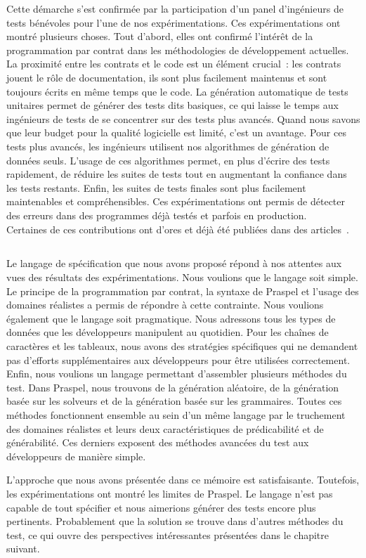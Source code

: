 Cette démarche s'est confirmée par la participation d'un panel d'ingénieurs de
tests bénévoles pour l'une de nos expérimentations. Ces expérimentations ont
montré plusieurs choses. Tout d'abord, elles ont confirmé l'intérêt de la
programmation par contrat dans les méthodologies de développement actuelles. La
proximité entre les contrats et le code est un élément crucial~: les contrats
jouent le rôle de documentation, ils sont plus facilement maintenus et sont
toujours écrits en même temps que le code. La génération automatique de tests
unitaires permet de générer des tests dits basiques, ce qui laisse le temps aux
ingénieurs de tests de se concentrer sur des tests plus avancés. Quand nous
savons que leur budget pour la qualité logicielle est limité, c'est un avantage.
Pour ces tests plus avancés, les ingénieurs utilisent nos algorithmes de
génération de données seuls. L'usage de ces algorithmes permet, en plus d'écrire
des tests rapidement, de réduire les suites de tests tout en augmentant la
confiance dans les tests restants. Enfin, les suites de tests finales sont plus
facilement maintenables et compréhensibles. Ces expérimentations ont permis de
détecter des erreurs dans des programmes déjà testés et parfois en production.
\\

Certaines de ces contributions ont d'ores et déjà été publiées dans des
articles~.

\subsection{}
\label{subsection:conclusions:summa}

Le langage de spécification que nous avons proposé répond à nos attentes aux
vues des résultats des expérimentations. Nous voulions que le langage soit
simple. Le principe de la programmation par contrat, la syntaxe de Praspel et
l'usage des domaines réalistes a permis de répondre à cette contrainte. Nous
voulions également que le langage soit pragmatique. Nous adressons tous les
types de données que les développeurs manipulent au quotidien. Pour les chaînes
de caractères et les tableaux, nous avons des stratégies spécifiques qui ne
demandent pas d'efforts supplémentaires aux développeurs pour être utilisées
correctement. Enfin, nous voulions un langage permettant d'assembler plusieurs
méthodes du test. Dans Praspel, nous trouvons de la génération aléatoire, de la
génération basée sur les solveurs et de la génération basée sur les grammaires.
Toutes ces méthodes fonctionnent ensemble au sein d'un même langage par le
truchement des domaines réalistes et leurs deux caractéristiques de
prédicabilité et de générabilité.  Ces derniers exposent des méthodes avancées
du test aux développeurs de manière simple.

L'approche que nous avons présentée dans ce mémoire est satisfaisante.
Toutefois, les expérimentations ont montré les limites de Praspel. Le langage
n'est pas capable de tout spécifier et nous aimerions générer des tests encore
plus pertinents. Probablement que la solution se trouve dans d'autres méthodes
du test, ce qui ouvre des perspectives intéressantes présentées dans le chapitre
suivant.
